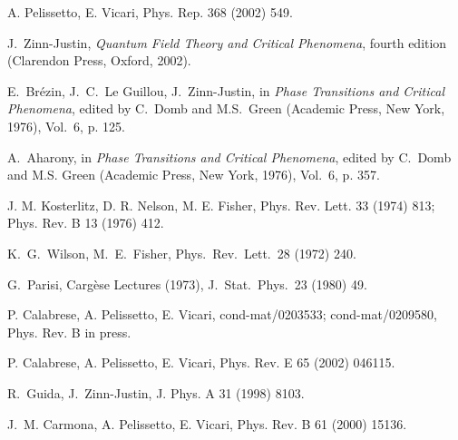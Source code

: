 \documentclass[a4paper,12pt]{article}
\begin{document}
\begin{thebibliography}{99}

A. Pelissetto, E. Vicari, Phys. Rep. 368 (2002) 549.

J.~Zinn-Justin,
{\em Quantum Field Theory and Critical Phenomena},
fourth edition (Clarendon Press, Oxford, 2002).

E.~Br\'ezin, J.~C.~Le Guillou, J.~Zinn-Justin, in
{\em Phase Transitions and Critical Phenomena},
edited by C.~Domb and M.S.~Green 
(Academic Press, New York, 1976),
Vol.\ 6, p. 125.


A.~Aharony, in
{\em Phase Transitions and Critical Phenomena},
edited by C.~Domb and M.S. Green
(Academic Press, New York, 1976), Vol.\ 6, p. 357.

J. M. Kosterlitz, D. R. Nelson, M. E. Fisher, 
Phys. Rev. Lett.  33 (1974) 813;
Phys. Rev. B  13  (1976) 412.

 K.~G.~Wilson, M.~E.~Fisher,
Phys.\ Rev.\ Lett.\  28  (1972) 240.

G.~Parisi, Carg\`{e}se Lectures (1973),
J.\ Stat.\ Phys.\  23  (1980) 49.

P. Calabrese, A. Pelissetto, E. Vicari,
cond-mat/0203533; cond-mat/0209580, Phys. Rev. B in press.

P. Calabrese, A. Pelissetto, E. Vicari, Phys. Rev. E  65 (2002) 046115.


R.~Guida, J.~Zinn-Justin,
J. Phys. A 31 (1998) 8103.

J.~M. Carmona, A. Pelissetto, E. Vicari,
Phys. Rev. B  61  (2000) 15136. 


\end{thebibliography}
\end{document}
